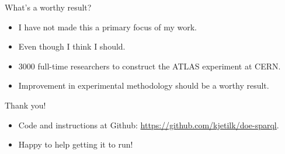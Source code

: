\documentclass[english,handout,aspectratio=169]{ifislide}
\begin{document}
\begin{frame}{What's a worthy result?}
  \begin{itemize}
  \item I have not made this a primary focus of my work.
  \item Even though I think I should.
  \item 3000 full-time researchers to construct the ATLAS experiment
    at CERN.
  \item Improvement in experimental methodology should be a worthy result.
  \end{itemize}


\end{frame}


\begin{frame}{Thank you!}

  \begin{itemize}
  \item Code and instructions at Github:
    \url{https://github.com/kjetilk/doe-sparql}.
  \item Happy to help getting it to run!
  \end{itemize}

\end{frame}
\end{document}
